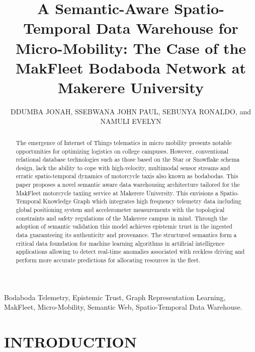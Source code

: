 \documentclass{ieeeaccess}
\begin{document}
\title{A Semantic-Aware Spatio-Temporal Data Warehouse for Micro-Mobility:
The Case of the MakFleet Bodaboda Network at Makerere University}

\author{\uppercase{Ddumba Jonah},
\uppercase{Ssebwana John Paul},
\uppercase{Sebunya Ronaldo},
and \uppercase{Namuli Evelyn}}
\address[1]{Department of Computer Science, Makerere University,
Kampala, Uganda}



\begin{abstract}
The emergence of Internet of Things telematics in micro mobility presents notable opportunities for optimizing logistics on college campuses. However, conventional relational database technologies such as those based on the Star or Snowflake schema design, lack the ability to cope with high-velocity, multimodal sensor streams and erratic spatio-temporal dynamics of motorcycle taxis also known as bodabodas. This paper proposes a novel semantic aware data warehousing architecture tailored for the MakFleet motorcycle taxiing service at Makerere University. This envisions a Spatio-Temporal Knowledge Graph which integrates high frequency telemetry data including global positioning system and accelerometer measurements with the topological constraints and safety regulations of the Makerere campus in mind. Through the adoption of semantic validation this model achieves epistemic trust in the ingested data guaranteeing its authenticity and provenance. The structured semantics form a critical data foundation for machine learning algorithms in artificial intelligence applications allowing to detect real-time anomalies associated with reckless driving and perform more accurate predictions for allocating resources in the fleet.
\end{abstract}

\begin{keywords}
Bodaboda Telemetry, Epistemic Trust, Graph Representation Learning,
MakFleet, Micro-Mobility, Semantic Web, Spatio-Temporal Data Warehouse.
\end{keywords}

\titlepgskip=-15pt
\maketitle
\sloppy


\section{INTRODUCTION}
\end{document}
